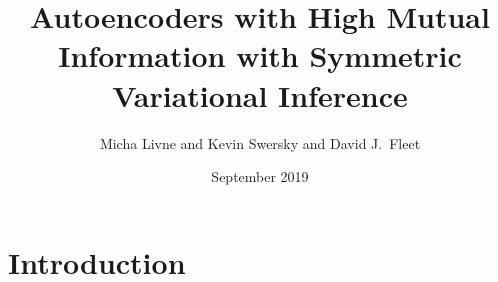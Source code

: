 \documentclass{article}
\title{Autoencoders with High Mutual Information with Symmetric Variational Inference}
\author{Micha Livne
and Kevin Swersky
and David J.\ Fleet
}
\date{September 2019}
\begin{document}
\maketitle

\section{Introduction}
\end{document}
